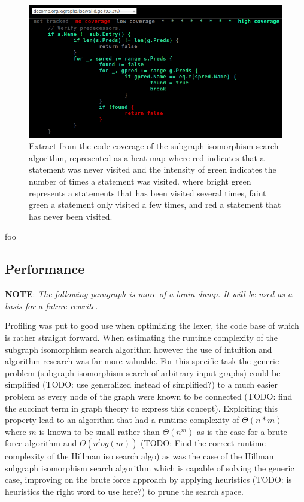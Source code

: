 \begin{figure}[htbp]
	\begin{center}
		\includegraphics[width=\textwidth]{inc/iso_code_coverage_heat_map.png}
		\caption{Extract from the code coverage of the subgraph isomorphism search algorithm, represented as a heat map where red indicates that a statement was never visited and the intensity of green indicates the number of times a statement was visited. where bright green represents a statements that has been visited several times, faint green a statement only visited a few times, and red a statement that has never been visited.}
		\label{fig:iso_heat_map}
	\end{center}
\end{figure}

foo


\subsection{Performance}


\textbf{NOTE}: \textit{The following paragraph is more of a brain-dump. It will be used as a basis for a future rewrite.}

Profiling was put to good use when optimizing the lexer, the code base of which is rather straight forward. When estimating the runtime complexity of the subgraph isomorphism search algorithm however the use of intuition and algorithm research was far more valuable. For this specific task the generic problem (subgraph isomorphism search of arbitrary input graphs) could be simplified (TODO: use generalized instead of simplified?) to a much easier problem as every node of the graph were known to be connected (TODO: find the succinct term in graph theory to express this concept). Exploiting this property lead to an algorithm that had a runtime complexity of $ \Theta(n*m) $ where $ m $ is known to be small rather than $ \Theta(n^m) $ as is the case for a brute force algorithm and $ \Theta(n^log(m)) $ (TODO: Find the correct runtime complexity of the Hillman iso search algo) as was the case of the Hillman subgraph isomorphism search algorithm which is capable of solving the generic case, improving on the brute force approach by applying heuristics (TODO: is heuristics the right word to use here?) to prune the search space.

